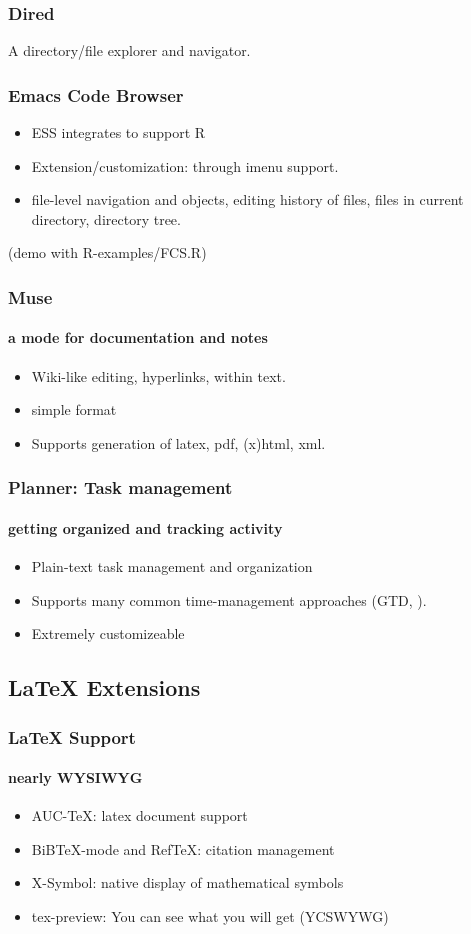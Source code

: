 \documentclass{beamer}
\begin{document}
\begin{frame} 
  \frametitle{Dired}
  A directory/file explorer and navigator.
\end{frame}

\begin{frame}
  \frametitle{Emacs Code Browser}
  \begin{itemize}
  \item ESS integrates to support R
  \item Extension/customization: through imenu support.
  \item file-level navigation and objects, editing history of files,
    files in current directory, directory tree.
  \end{itemize}
  (demo with R-examples/FCS.R)
\end{frame}

\begin{frame}
  \frametitle{Muse}
  \framesubtitle{a mode for documentation and notes}
  \begin{itemize}
  \item Wiki-like editing, hyperlinks, within text.
  \item simple format
  \item Supports generation of latex, pdf, (x)html, xml.
  \end{itemize}
\end{frame}

\begin{frame}
  \frametitle{Planner: Task management}
  \framesubtitle{getting organized and tracking activity}
  \begin{itemize}
  \item Plain-text task management and organization
  \item Supports many common time-management approaches (GTD, ).
  \item Extremely customizeable
  \end{itemize}
\end{frame}

\subsection{LaTeX Extensions}

\begin{frame}
  \frametitle{LaTeX Support}
  \framesubtitle{nearly WYSIWYG}
  \begin{itemize}
  \item AUC-TeX: latex document support
  \item BiBTeX-mode and RefTeX: citation management
  \item X-Symbol: native display of mathematical symbols
  \item tex-preview: You can see what you will get (YCSWYWG)
  \end{itemize}
\end{frame}
\end{document}
